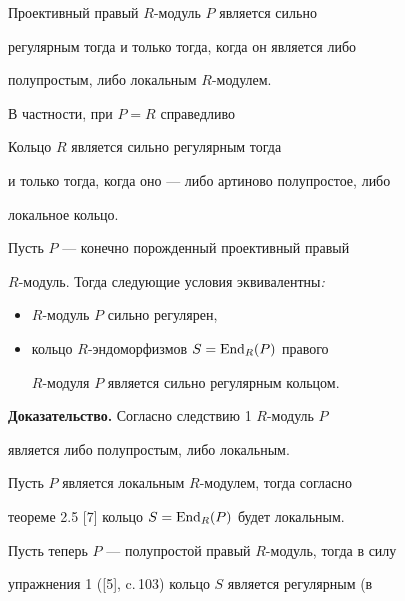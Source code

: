 \begin{cor} Проективный правый $R$-модуль $P$ является сильно


регулярным тогда и только тогда, когда он является либо


полупростым, либо локальным $R$-модулем.


\end{cor}





В частности, при $P=R$ справедливо





\begin{cor} Кольцо $R$ является сильно регулярным тогда


и только тогда, когда оно --- либо артиново полупростое, либо


локальное кольцо.


\end{cor}





\begin{thm} Пусть $P$ --- конечно порожденный проективный правый


$R$-модуль. Тогда следующие условия эквивалентны{\em :}


\begin{itemize}


\item[(1)] $R$-модуль $P$ сильно регулярен,


\item[(2)] кольцо $R$-эндоморфизмов $S=\operatorname{End}_R(P)$ правого


$R$-модуля $P$ является сильно регулярным кольцом.


\end{itemize}


\end{thm}





{\bf Доказательство.} Согласно следствию 1\; $R$-модуль $P$


является либо полупростым, либо локальным.


Пусть $P$ является локальным $R$-модулем, тогда согласно


теореме 2.5 [7] кольцо $S=\operatorname{End}_R(P)$ будет локальным.


Пусть теперь $P$ --- полупростой правый $R$-модуль, тогда в силу


упражнения 1 ([5], c.\,103) кольцо $S$ является регулярным (в


